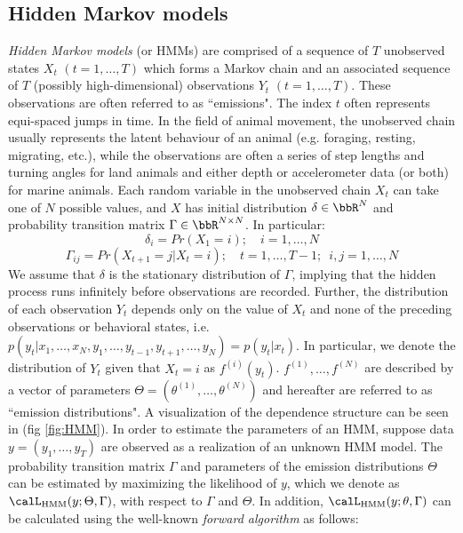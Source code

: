 

\subsection{Hidden Markov models}
\label{subsection:HMMs}

\textit{Hidden Markov models} (or HMMs) are comprised of a sequence of $T$ unobserved states $X_t$ $(t = 1, \ldots, T)$ which forms a Markov chain and an associated sequence of $T$ (possibly high-dimensional) observations $Y_t$ $(t = 1, \ldots, T)$. These observations are often referred to as ``emissions". The index $t$ often represents equi-spaced jumps in time. In the field of animal movement, the unobserved chain usually represents the latent behaviour of an animal (e.g. foraging, resting, migrating, etc.), while the observations are often a series of step lengths and turning angles for land animals and either depth or accelerometer data (or both) for marine animals. Each random variable in the unobserved chain $X_t$ can take one of $N$ possible values, and $X$ has initial distribution $\delta \in \bbR^N$ and probability transition matrix $\Gamma \in \bbR^{N \times N}$. In particular:
%
$$\delta_i = Pr(X_1 = i); \quad i = 1,\ldots,N$$
%
$$\Gamma_{ij} = Pr(X_{t+1} = j | X_t = i); \quad t = 1, \ldots, T-1; \enspace i,j = 1,\ldots,N $$
%
We assume that $\delta$ is the stationary distribution of $\Gamma$, implying that the hidden process runs infinitely before observations are recorded. Further, the distribution of each observation $Y_t$ depends only on the value of $X_t$ and none of the preceding observations or behavioral states, i.e. $p(y_t|x_1,\ldots, x_N, y_1,\ldots,y_{t-1},y_{t+1},\ldots,y_N) = p(y_t|x_t)$. In particular, we denote the distribution of $Y_t$ given that $X_t = i$ as $f^{(i)}(y_t)$. $f^{(1)},\ldots,f^{(N)}$ are described by a vector of parameters $\Theta = (\theta^{(1)},\ldots,\theta^{(N)})$ and hereafter are referred to as ``emission distributions". A visualization of the dependence structure can be seen in (fig \ref{fig:HMM}).
In order to estimate the parameters of an HMM, suppose data $y = (y_1,\ldots,y_T)$ are observed as a realization of an unknown HMM model. The probability transition matrix $\Gamma$ and parameters of the emission distributions $\Theta$ can be estimated by maximizing the likelihood of $y$, which we denote as $\calL_{\text{HMM}}(y;\Theta,\Gamma)$, with respect to $\Gamma$ and $\Theta$. In addition, $\calL_{\text{HMM}}(y;\theta,\Gamma)$ can be calculated using the well-known \textit{forward algorithm} \citep{Zucchini:2016} as follows:
